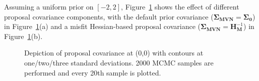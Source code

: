Assuming a uniform prior on $[-2,2]$,
Figure~\ref{fig:rosen_prop_covar} shows the effect of different
proposal covariance components, with the default prior covariance 
($\boldsymbol{\Sigma_{MVN}} = \boldsymbol{\Sigma_0}$) in
Figure~\ref{fig:rosen_prop_covar}(a) and a misfit Hessian-based
proposal covariance 
($\boldsymbol{\Sigma_{MVN}} = \boldsymbol{H}_{\boldsymbol{M}}^{-1}$) 
in Figure~\ref{fig:rosen_prop_covar}(b).
\begin{figure}[htbp]
  \begin{subfigmatrix}{2}
  \end{subfigmatrix}
  \caption{Depiction of proposal covariance at (0,0) with contours at one/two/three standard deviations.  2000 MCMC samples are performed and every 20th sample is plotted.}
\label{fig:rosen_prop_covar}
\end{figure}
